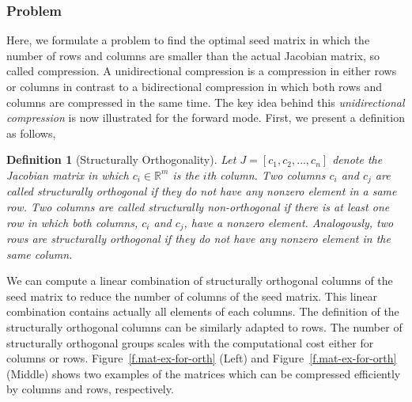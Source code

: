 \documentclass[12pt, twoside]{book}
\newtheorem{definition}{Definition}
\newcommand{\figref}[1]{Figure~\protect\ref{#1}}
\newcommand{\setR}{\ensuremath{\mathbb{R}}}
\begin{document}
\subsubsection{Problem}
\label{ss.problem.full}
Here, we formulate a problem to find the optimal seed matrix in which
the number of rows and columns are smaller than the actual Jacobian matrix, so called compression.
A unidirectional compression is a compression in either rows or columns in contrast to
a bidirectional compression in which both rows and columns are compressed in the same time.
The key idea behind this \emph{unidirectional compression} is now illustrated for the
forward mode. First, we present a definition as follows,
\begin{definition}[Structurally Orthogonality]
\label{d:struct_orth}
Let $J=[c_1, c_2, \dots, c_n]$ denote the Jacobian matrix in which $c_i \in \setR^m$ is the $i$th
column. Two columns $c_i$ and $c_j$ are
called \emph{structurally orthogonal} if they do not have any nonzero element in a same
row. Two columns are called \emph{structurally non-orthogonal} if there is at least one
row in which both columns, $c_i$ and $c_j$, have a nonzero element.
Analogously, two rows are
\emph{structurally orthogonal} if they do not have any nonzero element in the same column.
\end{definition}
We can compute a linear combination of structurally orthogonal columns of the seed matrix
to reduce the number of columns of the seed matrix. This linear combination contains actually all elements of each columns. The definition of the structurally orthogonal columns can be similarly adapted to rows. The number of structurally orthogonal groups scales with the computational cost either for columns or rows.
\figref{f.mat-ex-for-orth} (Left) and \figref{f.mat-ex-for-orth} (Middle) shows two examples
of the matrices which can be compressed efficiently by columns and rows, respectively.
\end{document}
